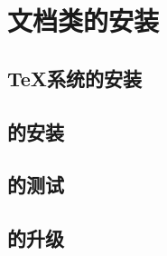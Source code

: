 \chapter{文档类的安装}\label{chapter:installtion}

\section{{\TeX}系统的安装}

\section{{\njuthesis}的安装}

\section{{\njuthesis}的测试}

\section{{\njuthesis}的升级}
